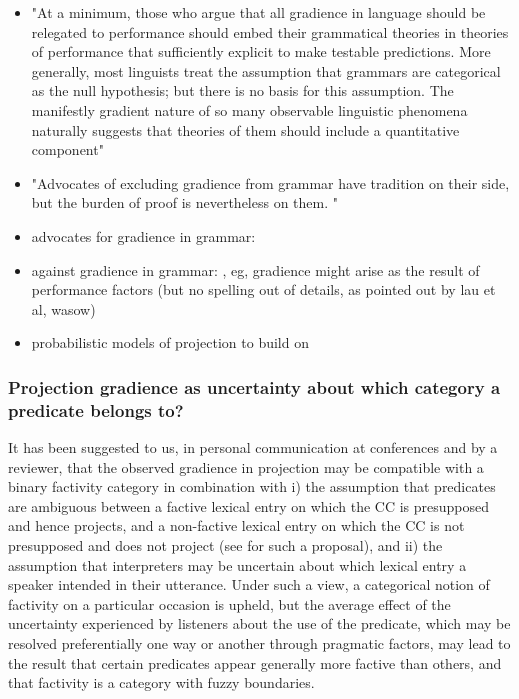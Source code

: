 \documentclass[11pt,fleqn]{article}
\newcommand{\6}{\mbox{$[\hspace*{-.6mm}[$}}
\newcommand{\9}{\mbox{$]\hspace*{-.6mm}]$}}
\begin{document}
\begin{itemize}
	\item "At a minimum, those
who argue that all gradience in language should be relegated to performance
should embed their grammatical theories in theories of performance that
sufficiently explicit to make testable predictions.
More generally, most linguists treat the assumption that grammars are
categorical as the null hypothesis; but there is no basis for this assumption. The
manifestly gradient nature of so many observable linguistic phenomena naturally
suggests that theories of them should include a quantitative component" \cite{wasow2007}
\item "Advocates of excluding gradience from grammar
have tradition on their side, but the burden of proof is nevertheless on them. " \cite{wasow2007}
	\item advocates for gradience in grammar: \cite{keller2000,sorace2005,lau2014,lau2017,wasow2007}
	\item against gradience in grammar: \cite{sprouse2007,sprouse2013, hofmeister2010}, eg, gradience might arise as the result of performance factors (but no spelling out of details, as pointed out by lau et al, wasow)
	\item probabilistic models of projection to build on \cite{qing2016, stevens-etal2017}
\end{itemize}

\subsubsection{Projection gradience as uncertainty about which category a predicate belongs to?}\label{s-412}

It has been suggested to us, in personal communication at conferences and by a reviewer, that the observed gradience in projection may be compatible with a binary factivity category in combination with i) the assumption that predicates are ambiguous between a factive lexical entry on which the CC is presupposed and hence projects, and a non-factive lexical entry on which the CC is not presupposed and does not project (see \citealt[1736]{spector-egre2015} for such a proposal), and ii) the assumption that interpreters may be uncertain about which lexical entry a speaker intended in their utterance. Under such a view, a categorical notion of factivity on a particular occasion is upheld, but the average effect of the uncertainty experienced by listeners about the use of the predicate, which may be resolved preferentially one way or another through pragmatic factors, may lead to the result that certain predicates appear generally more factive than others, and that factivity is a category with fuzzy boundaries.
\end{document}
